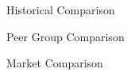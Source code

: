 \documentclass[10pt]{article}
\begin{document}
  \begin{core}{Historical Comparison}



  \end{core}

  \begin{core}{Peer Group Comparison}


  \end{core}

  \begin{core}{Market Comparison}


  \end{core}
  
\end{document}
